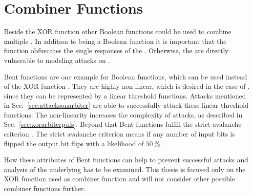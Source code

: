 \section{Combiner Functions}
\label{sec:combinerfunctions}

Beside the \ac{XOR} function other Boolean functions could be used to combine multiple \apuf.
In addition to being a Boolean function it is important that the function obfuscates the single responses of the \apufs. 
Otherwise, the \apufs are directly vulnerable to modeling attacks on \apufs.

Bent functions are one example for Boolean functions, which can be used instead of the \ac{XOR} function \cite{Adams1990Thedesign,Forre1990Thedefinition,Seberry1993Highlycriterion}.
They are highly non-linear, which is desired in the case of \apufs, since they can be represented by a linear threshold functions.
Attacks mentioned in Sec.\ \ref{sec:attacksonarbiter} are able to successfully attack these linear threshold functions.
The non-linearity increases the complexity of attacks, as described in Sec.\ \ref{sec:xorarbiterpufs}. %
Beyond that Bent functions fulfill the strict avalanche criterion \cite{Feistel1973Cryptographyprivacy}.
The strict avalanche criterion means if any number of input bits is flipped the output bit flips with a likelihood of $50\ \%$.

How these attributes of Bent functions can help to prevent successful attacks and analysis of the underlying \apufs has to be examined.
This thesis is focused only on the \ac{XOR} function used as combiner function and will not consider other possible combiner functions further.

